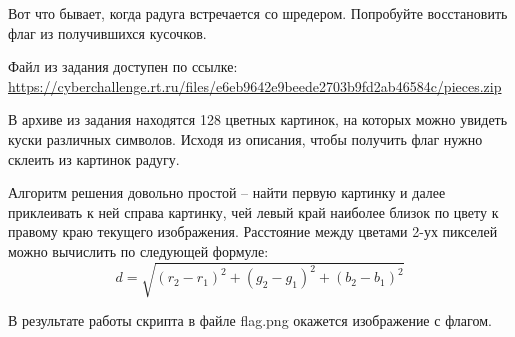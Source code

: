 
Вот что бывает, когда радуга встречается со шредером. Попробуйте восстановить флаг из получившихся кусочков.

Файл из задания доступен по ссылке:	\url{https://cyberchallenge.rt.ru/files/e6eb9642e9beede2703b9fd2ab46584c/pieces.zip}

В архиве из задания находятся 128 цветных картинок, на которых можно увидеть куски различных символов. Исходя из описания, чтобы получить флаг нужно склеить из картинок радугу.

Алгоритм решения довольно простой – найти первую картинку и далее приклеивать к ней справа картинку, чей левый край наиболее близок по цвету к правому краю текущего изображения. Расстояние между цветами 2-ух пикселей можно вычислить по следующей формуле:
$$d=\sqrt{(r_2-r_1)^2+(g_2-g_1)^2+(b_2-b_1)^2}$$


В результате работы скрипта в файле flag.png окажется изображение с флагом.


